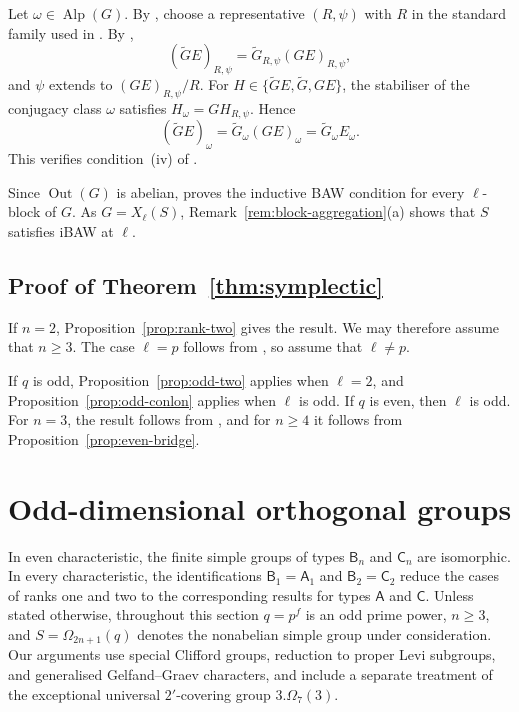 \documentclass[10pt]{amsart}
\theoremstyle{definition}
\renewcommand{\geq}{\geqslant}
\let\oldendproof\endproof
\renewenvironment{proof}[1][\proofname]{%
  \oldproof[\bfseries #1]%
}{\oldendproof}
\DeclareMathOperator{\Out}{Out}
\DeclareMathOperator{\Alp}{Alp}
\numberwithin{equation}{section}
\numberwithin{table}{section}
\begin{document}
\begin{proof}
Let $\omega\in\Alp(G)$.
By \cite[Section~2.C]{Li2021}, choose a representative $(R,\psi)$
with $R$ in the standard family used in \cite[Lemma~5.5]{Li2021}.
By \cite[Lemma~5.5(1)--(2)]{Li2021},
\[
 (\widetilde GE)_{R,\psi}
   =\widetilde G_{R,\psi}(GE)_{R,\psi},
\]
and $\psi$ extends to $(GE)_{R,\psi}/R$.
For $H\in\{\widetilde GE,\widetilde G,GE\}$, the stabiliser of the
conjugacy class $\omega$ satisfies $H_\omega=GH_{R,\psi}$.  Hence
\[
 (\widetilde GE)_\omega
   =\widetilde G_\omega(GE)_\omega
   =\widetilde G_\omega E_\omega.
\]
This verifies condition~\textup{(iv)} of
\cite[Theorem~4.5]{BroughSpath2022}.

Since $\Out(G)$ is abelian, \cite[Theorem~4.5]{BroughSpath2022} proves
the inductive BAW condition for every $\ell$-block of $G$.
As $G=X_\ell(S)$, Remark~\ref{rem:block-aggregation}\textup{(a)} shows that $S$
satisfies iBAW at $\ell$.
\end{proof}

\subsection{Proof of Theorem~\ref{thm:symplectic}}

\begin{proof}
If $n=2$, Proposition~\ref{prop:rank-two} gives the result.
We may therefore assume that $n\geq3$.
The case $\ell=p$ follows from \cite[Theorem~C]{Spath2013}, so
assume that $\ell\neq p$.

If $q$ is odd, Proposition~\ref{prop:odd-two} applies when $\ell=2$,
and Proposition~\ref{prop:odd-conlon} applies when $\ell$ is odd.
If $q$ is even, then $\ell$ is odd.  For $n=3$, the result follows
from \cite[Theorem~5.5]{SchaefferFry2014}, and for $n\geq4$ it follows
from Proposition~\ref{prop:even-bridge}.
\end{proof}

\section{Odd-dimensional orthogonal groups}\label{sec:type-b}

In even characteristic, the finite simple groups of types $\mathsf B_n$
and $\mathsf C_n$ are isomorphic.  In every characteristic, the
identifications $\mathsf B_1=\mathsf A_1$ and $\mathsf B_2=\mathsf C_2$
reduce the cases of ranks one and two to the corresponding results for
types $\mathsf A$ and $\mathsf C$.  Unless stated otherwise, throughout
this section $q=p^f$ is an odd prime power, $n\geq3$, and
$S=\Omega_{2n+1}(q)$ denotes the nonabelian simple group under consideration.
Our arguments use special
Clifford groups, reduction to proper Levi subgroups, and generalised
Gelfand--Graev characters, and include a separate treatment of the
exceptional universal $2'$-covering group $3.\Omega_7(3)$.
\end{document}
